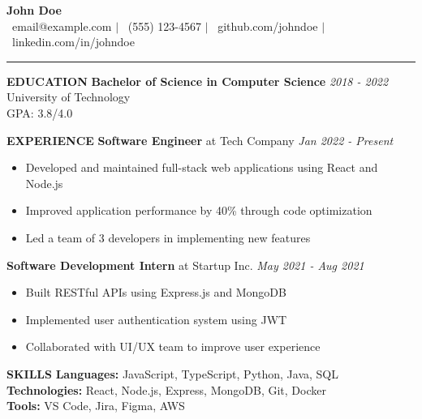 \documentclass[11pt,a4paper]{article}
\newcommand{\cvheader}[1]{\textbf{\Large #1}}
\newcommand{\cvsubheader}[1]{\textbf{\large #1}}
\newcommand{\daterange}[1]{\hfill \textit{#1}}
\begin{document}
\begin{center}
    \cvheader{John Doe} \\
    \vspace{0.1cm}
    \faEnvelope\ email@example.com $|$ 
    \faPhone\ (555) 123-4567 $|$ 
    \faGithub\ github.com/johndoe $|$ 
    \faLinkedin\ linkedin.com/in/johndoe
\end{center}

\vspace{0.3cm}
\hrule
\vspace{0.3cm}

\cvsubheader{EDUCATION}
\vspace{0.2cm}
\textbf{Bachelor of Science in Computer Science} \daterange{2018 - 2022}\\
University of Technology\\
GPA: 3.8/4.0

\vspace{0.3cm}
\cvsubheader{EXPERIENCE}
\vspace{0.2cm}
\textbf{Software Engineer} at Tech Company \daterange{Jan 2022 - Present}
\begin{itemize}[leftmargin=*]
    \item Developed and maintained full-stack web applications using React and Node.js
    \item Improved application performance by 40\% through code optimization
    \item Led a team of 3 developers in implementing new features
\end{itemize}

\textbf{Software Development Intern} at Startup Inc. \daterange{May 2021 - Aug 2021}
\begin{itemize}[leftmargin=*]
    \item Built RESTful APIs using Express.js and MongoDB
    \item Implemented user authentication system using JWT
    \item Collaborated with UI/UX team to improve user experience
\end{itemize}

\vspace{0.3cm}
\cvsubheader{SKILLS}
\vspace{0.2cm}
\textbf{Languages:} JavaScript, TypeScript, Python, Java, SQL\\
\textbf{Technologies:} React, Node.js, Express, MongoDB, Git, Docker\\
\textbf{Tools:} VS Code, Jira, Figma, AWS
\end{document}
